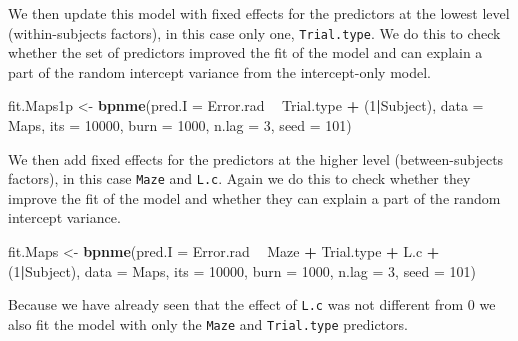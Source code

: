 \documentclass[11pt,]{article}
\newenvironment{Shaded}{\begin{snugshade}}{\end{snugshade}}
\newcommand{\DataTypeTok}[1]{\textcolor[rgb]{0.13,0.29,0.53}{#1}}
\newcommand{\DecValTok}[1]{\textcolor[rgb]{0.00,0.00,0.81}{#1}}
\newcommand{\KeywordTok}[1]{\textcolor[rgb]{0.13,0.29,0.53}{\textbf{#1}}}
\newcommand{\NormalTok}[1]{#1}
\newcommand{\OperatorTok}[1]{\textcolor[rgb]{0.81,0.36,0.00}{\textbf{#1}}}
\newcommand{\StringTok}[1]{\textcolor[rgb]{0.31,0.60,0.02}{#1}}
\begin{document}
We then update this model with fixed effects for the predictors at the
lowest level (within-subjects factors), in this case only one,
\verb|Trial.type|. We do this to check whether the set of predictors
improved the fit of the model and can explain a part of the random
intercept variance from the intercept-only model.

\begin{Shaded}
\begin{Highlighting}[]
\NormalTok{fit.Maps1p <-}\StringTok{ }\KeywordTok{bpnme}\NormalTok{(}\DataTypeTok{pred.I =}\NormalTok{ Error.rad }\OperatorTok{~}\StringTok{ }\NormalTok{Trial.type }\OperatorTok{+}\StringTok{ }\NormalTok{(}\DecValTok{1}\OperatorTok{|}\NormalTok{Subject),}
                    \DataTypeTok{data =}\NormalTok{ Maps,}
                    \DataTypeTok{its =} \DecValTok{10000}\NormalTok{, }\DataTypeTok{burn =} \DecValTok{1000}\NormalTok{, }\DataTypeTok{n.lag =} \DecValTok{3}\NormalTok{, }\DataTypeTok{seed =} \DecValTok{101}\NormalTok{)}
\end{Highlighting}
\end{Shaded}

We then add fixed effects for the predictors at the higher level
(between-subjects factors), in this case \verb|Maze| and \verb|L.c|.
Again we do this to check whether they improve the fit of the model and
whether they can explain a part of the random intercept variance.

\begin{Shaded}
\begin{Highlighting}[]
\NormalTok{fit.Maps <-}\StringTok{ }\KeywordTok{bpnme}\NormalTok{(}\DataTypeTok{pred.I =}\NormalTok{ Error.rad }\OperatorTok{~}\StringTok{ }\NormalTok{Maze }\OperatorTok{+}\StringTok{ }\NormalTok{Trial.type }\OperatorTok{+}\StringTok{ }\NormalTok{L.c }\OperatorTok{+}\StringTok{ }\NormalTok{(}\DecValTok{1}\OperatorTok{|}\NormalTok{Subject),}
                  \DataTypeTok{data =}\NormalTok{ Maps,}
                  \DataTypeTok{its =} \DecValTok{10000}\NormalTok{, }\DataTypeTok{burn =} \DecValTok{1000}\NormalTok{, }\DataTypeTok{n.lag =} \DecValTok{3}\NormalTok{, }\DataTypeTok{seed =} \DecValTok{101}\NormalTok{)}
\end{Highlighting}
\end{Shaded}

Because we have already seen that the effect of \verb|L.c| was not
different from 0 we also fit the model with only the \verb|Maze| and
\verb|Trial.type| predictors.
\end{document}
